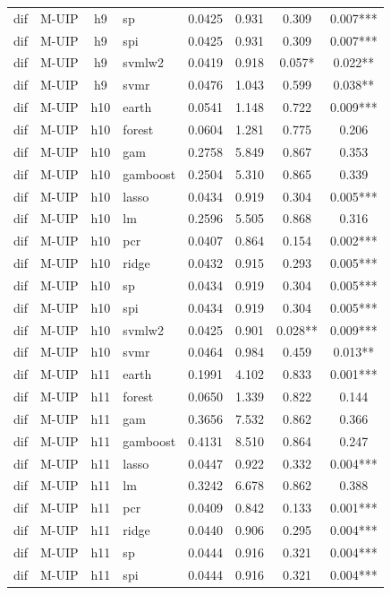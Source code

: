 \begin{ThreePartTable}
\begin{longtable}[t]{llclcccc}
dif & M-UIP & h9 & sp & 0.0425 & 0.931 & 0.309 & 0.007***\\
dif & M-UIP & h9 & spi & 0.0425 & 0.931 & 0.309 & 0.007***\\
dif & M-UIP & h9 & svmlw2 & 0.0419 & 0.918 & 0.057* & 0.022**\\
dif & M-UIP & h9 & svmr & 0.0476 & 1.043 & 0.599 & 0.038**\\
\addlinespace
dif & M-UIP & h10 & earth & 0.0541 & 1.148 & 0.722 & 0.009***\\
dif & M-UIP & h10 & forest & 0.0604 & 1.281 & 0.775 & 0.206\\
dif & M-UIP & h10 & gam & 0.2758 & 5.849 & 0.867 & 0.353\\
dif & M-UIP & h10 & gamboost & 0.2504 & 5.310 & 0.865 & 0.339\\
dif & M-UIP & h10 & lasso & 0.0434 & 0.919 & 0.304 & 0.005***\\
dif & M-UIP & h10 & lm & 0.2596 & 5.505 & 0.868 & 0.316\\
dif & M-UIP & h10 & pcr & 0.0407 & 0.864 & 0.154 & 0.002***\\
dif & M-UIP & h10 & ridge & 0.0432 & 0.915 & 0.293 & 0.005***\\
dif & M-UIP & h10 & sp & 0.0434 & 0.919 & 0.304 & 0.005***\\
dif & M-UIP & h10 & spi & 0.0434 & 0.919 & 0.304 & 0.005***\\
dif & M-UIP & h10 & svmlw2 & 0.0425 & 0.901 & 0.028** & 0.009***\\
dif & M-UIP & h10 & svmr & 0.0464 & 0.984 & 0.459 & 0.013**\\
\addlinespace
dif & M-UIP & h11 & earth & 0.1991 & 4.102 & 0.833 & 0.001***\\
dif & M-UIP & h11 & forest & 0.0650 & 1.339 & 0.822 & 0.144\\
dif & M-UIP & h11 & gam & 0.3656 & 7.532 & 0.862 & 0.366\\
dif & M-UIP & h11 & gamboost & 0.4131 & 8.510 & 0.864 & 0.247\\
dif & M-UIP & h11 & lasso & 0.0447 & 0.922 & 0.332 & 0.004***\\
dif & M-UIP & h11 & lm & 0.3242 & 6.678 & 0.862 & 0.388\\
dif & M-UIP & h11 & pcr & 0.0409 & 0.842 & 0.133 & 0.001***\\
dif & M-UIP & h11 & ridge & 0.0440 & 0.906 & 0.295 & 0.004***\\
dif & M-UIP & h11 & sp & 0.0444 & 0.916 & 0.321 & 0.004***\\
dif & M-UIP & h11 & spi & 0.0444 & 0.916 & 0.321 & 0.004***\\

\end{longtable}
\end{ThreePartTable}
